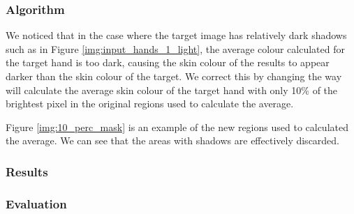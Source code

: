 \subsubsection*{Algorithm}
We noticed that in the case where the target image has relatively dark shadows such as in Figure \ref{img:input_hands_1_light}, the average colour calculated for the target hand is too dark, causing the skin colour of the results to appear darker than the skin colour of the target. We correct this by changing the way will calculate the average skin colour of the target hand with only 10\% of the brightest pixel in the original regions used to calculate the average. 

Figure \ref{img:10_perc_mask} is an example of the new regions used to calculated the average. We can see that the areas with shadows are effectively discarded.

\subsubsection*{Results}


\subsubsection*{Evaluation}








% 

